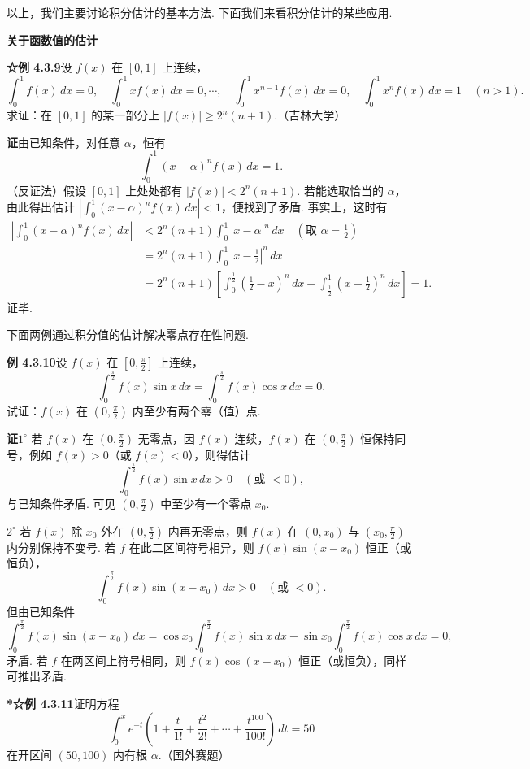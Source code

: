 \documentclass[UTF8,12pt,a4paper,fontset=fandol]{ctexart}
\begin{document}
\noindent 以上，我们主要讨论积分估计的基本方法. 下面我们来看积分估计的某些应用.

\noindent\textbf{关于函数值的估计}

\noindent\textbf{☆例 4.3.9}\quad 设 $f(x)$ 在 $[0,1]$ 上连续，
\[
\int_0^1 f(x)\,dx=0,\quad
\int_0^1 xf(x)\,dx=0,\cdots,\quad
\int_0^1 x^{n-1}f(x)\,dx=0,\quad
\int_0^1 x^n f(x)\,dx=1\quad(n>1).
\]
求证：在 $[0,1]$ 的某一部分上 $|f(x)|\ge2^n(n+1)$.（吉林大学）

\noindent\textbf{证}\quad 由已知条件，对任意 $\alpha$，恒有
\[
\int_0^1(x-\alpha)^n f(x)\,dx=1.
\tag{1}
\]
（反证法）假设 $[0,1]$ 上处处都有 $|f(x)|<2^n(n+1)$. 若能选取恰当的 $\alpha$，由此得出估计 $\left|\int_0^1(x-\alpha)^n f(x)\,dx\right|<1$，便找到了矛盾. 事实上，这时有
\[
\begin{aligned}
\left|\int_0^1(x-\alpha)^n f(x)\,dx\right|
&<2^n(n+1)\int_0^1|x-\alpha|^n\,dx\quad\left(\text{取 }\alpha=\frac12\right)\\
&=2^n(n+1)\int_0^1\left|x-\frac12\right|^n\,dx\\
&=2^n(n+1)\left[\int_0^{\frac12}\left(\frac12-x\right)^n\,dx
+\int_{\frac12}^1\left(x-\frac12\right)^n\,dx\right]=1.
\end{aligned}
\]
证毕.

\noindent 下面两例通过积分值的估计解决零点存在性问题.

\noindent\textbf{例 4.3.10}\quad 设 $f(x)$ 在 $\left[0,\frac\pi2\right]$ 上连续，
\[
\int_0^{\frac\pi2} f(x)\sin x\,dx
=\int_0^{\frac\pi2} f(x)\cos x\,dx=0.
\]
试证：$f(x)$ 在 $\left(0,\frac\pi2\right)$ 内至少有两个零（值）点.

\noindent\textbf{证}\quad $1^\circ$ 若 $f(x)$ 在 $\left(0,\frac\pi2\right)$ 无零点，因 $f(x)$ 连续，$f(x)$ 在 $\left(0,\frac\pi2\right)$ 恒保持同号，例如 $f(x)>0$（或 $f(x)<0$），则得估计
\[
\int_0^{\frac\pi2} f(x)\sin x\,dx>0\quad(\text{或 }<0),
\]
与已知条件矛盾. 可见 $\left(0,\frac\pi2\right)$ 中至少有一个零点 $x_0$.

\noindent $2^\circ$ 若 $f(x)$ 除 $x_0$ 外在 $\left(0,\frac\pi2\right)$ 内再无零点，则 $f(x)$ 在 $(0,x_0)$ 与 $\left(x_0,\frac\pi2\right)$ 内分别保持不变号. 若 $f$ 在此二区间符号相异，则 $f(x)\sin(x-x_0)$ 恒正（或恒负），
\[
\int_0^{\frac\pi2} f(x)\sin(x-x_0)\,dx>0\quad(\text{或 }<0).
\]
但由已知条件
\[
\int_0^{\frac\pi2} f(x)\sin(x-x_0)\,dx
=\cos x_0\int_0^{\frac\pi2} f(x)\sin x\,dx
-\sin x_0\int_0^{\frac\pi2} f(x)\cos x\,dx=0,
\]
矛盾. 若 $f$ 在两区间上符号相同，则 $f(x)\cos(x-x_0)$ 恒正（或恒负），同样可推出矛盾.

\noindent\textbf{*☆例 4.3.11}\quad 证明方程
\[
\int_0^x e^{-t}\left(1+\frac{t}{1!}+\frac{t^2}{2!}+\cdots+\frac{t^{100}}{100!}\right)\,dt=50
\]
在开区间 $(50,100)$ 内有根 $\alpha$.（国外赛题）
\end{document}
